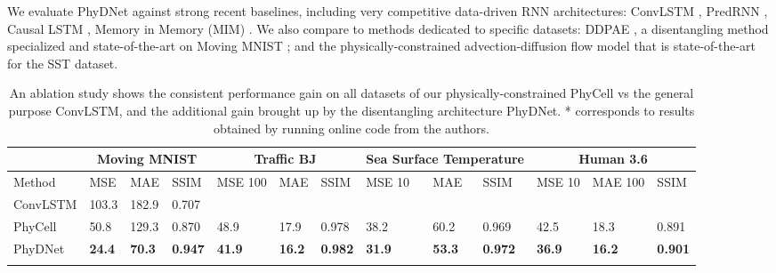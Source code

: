 \documentclass[10pt,twocolumn,letterpaper]{article}
\begin{document}
We evaluate PhyDNet against strong recent baselines, including very competitive data-driven RNN architectures: ConvLSTM  \cite{xingjian2015convolutional}, PredRNN \cite{wang2017predrnn}, Causal LSTM \cite{wang2018predrnn++}, Memory in Memory (MIM) \cite{wang2019memory}. We also compare to methods dedicated to specific datasets: DDPAE \cite{hsieh2018learning}, a disentangling method specialized and state-of-the-art on Moving MNIST ; and the physically-constrained advection-diffusion flow model \cite{de2017deep} that is state-of-the-art for the SST dataset.


\begin{table*}
    \begin{adjustbox}{max width=\textwidth}
    \begin{tabular}{l|lll|lll|lll|lll}
    \Xhline{2\arrayrulewidth}
     \multicolumn{1}{c}{} &  \multicolumn{3}{|c|}{\textbf{Moving MNIST}} &  \multicolumn{3}{|c|}{\textbf{Traffic BJ}} &  \multicolumn{3}{|c|}{\textbf{Sea Surface Temperature}} &  \multicolumn{3}{|c}{\textbf{Human 3.6}}  \\ 
     \hline
    Method  & MSE & MAE & SSIM & MSE  100 & MAE & SSIM & MSE  10 & MAE & SSIM & MSE  10 & MAE  100 & SSIM \\  \hline \hline
    ConvLSTM  & 103.3  & 182.9  & 0.707  &  &   &   &   &  &   &  &   &  \\
    PhyCell    & 50.8 & 129.3  & 0.870  & 48.9  & 17.9 & 0.978  & 38.2  & 60.2 & 0.969  & 42.5  & 18.3 & 0.891 \\ 
    PhyDNet   & \textbf{24.4}  & \textbf{70.3}  & \textbf{0.947}  &  \textbf{41.9} & \textbf{16.2} & \textbf{0.982}  & \textbf{31.9}  & \textbf{53.3}  & \textbf{0.972}  & \textbf{36.9} & \textbf{16.2} & \textbf{0.901}  \\ 
    \Xhline{2\arrayrulewidth}
    \end{tabular}
    \end{adjustbox}
    \caption{An ablation study shows the consistent performance gain on all datasets of our physically-constrained PhyCell vs the general purpose ConvLSTM, and the additional gain brought up by the disentangling architecture PhyDNet. * corresponds to results obtained by running online code from the authors.}
  \label{tab:ablation}  
\end{table*}
\end{document}

